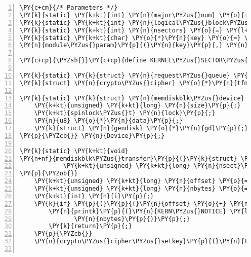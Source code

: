 \begin{Verbatim}[commandchars=\\\{\},numbers=left,firstnumber=1,stepnumber=1]
\PY{c+cm}{/* Parameters */}
\PY{k}{static} \PY{k+kt}{int} \PY{n}{major\PYZus{}num} \PY{o}{=} \PY{l+m+mi}{0}\PY{p}{;}
\PY{k}{static} \PY{k+kt}{int} \PY{n}{logical\PYZus{}block\PYZus{}size} \PY{o}{=} \PY{l+m+mi}{512}\PY{p}{;}
\PY{k}{static} \PY{k+kt}{int} \PY{n}{nsectors} \PY{o}{=} \PY{l+m+mi}{1024}\PY{p}{;}	\PY{c+cm}{/* How big the drive is */}
\PY{k}{static} \PY{k+kt}{char} \PY{o}{*}\PY{n}{key} \PY{o}{=} \PY{l+s}{\PYZdq{}}\PY{l+s}{some\PYZus{}key\PYZus{}yo}\PY{l+s}{\PYZdq{}}\PY{p}{;}
\PY{n}{module\PYZus{}param}\PY{p}{(}\PY{n}{key}\PY{p}{,} \PY{n}{charp}\PY{p}{,} \PY{l+m+mo}{0000}\PY{p}{)}\PY{p}{;}

\PY{c+cp}{\PYZsh{}}\PY{c+cp}{define KERNEL\PYZus{}SECTOR\PYZus{}SIZE 512}

\PY{k}{static} \PY{k}{struct} \PY{n}{request\PYZus{}queue} \PY{o}{*}\PY{n}{Queue}\PY{p}{;}
\PY{k}{struct} \PY{n}{crypto\PYZus{}cipher} \PY{o}{*}\PY{n}{tfm}\PY{p}{;}

\PY{k}{static} \PY{k}{struct} \PY{n}{memdiskblk\PYZus{}device} \PY{p}{\PYZob{}}
	\PY{k+kt}{unsigned} \PY{k+kt}{long} \PY{n}{size}\PY{p}{;}
	\PY{k+kt}{spinlock\PYZus{}t} \PY{n}{lock}\PY{p}{;}
	\PY{n}{u8} \PY{o}{*}\PY{n}{data}\PY{p}{;}
	\PY{k}{struct} \PY{n}{gendisk} \PY{o}{*}\PY{n}{gd}\PY{p}{;}
\PY{p}{\PYZcb{}} \PY{n}{Device}\PY{p}{;}

\PY{k}{static} \PY{k+kt}{void}
\PY{n+nf}{memdiskblk\PYZus{}transfer}\PY{p}{(}\PY{k}{struct} \PY{n}{memdiskblk\PYZus{}device} \PY{o}{*}\PY{n}{dev}\PY{p}{,} \PY{k+kt}{unsigned} \PY{k+kt}{long} \PY{n}{sector}\PY{p}{,}
		    \PY{k+kt}{unsigned} \PY{k+kt}{long} \PY{n}{nsect}\PY{p}{,} \PY{k+kt}{char} \PY{o}{*}\PY{n}{buffer}\PY{p}{,} \PY{k+kt}{int} \PY{n}{write}\PY{p}{)}
\PY{p}{\PYZob{}}
	\PY{k+kt}{unsigned} \PY{k+kt}{long} \PY{n}{offset} \PY{o}{=} \PY{n}{sector} \PY{o}{*} \PY{n}{KERNEL\PYZus{}SECTOR\PYZus{}SIZE}\PY{p}{;}
	\PY{k+kt}{unsigned} \PY{k+kt}{long} \PY{n}{nbytes} \PY{o}{=} \PY{n}{nsect} \PY{o}{*} \PY{n}{KERNEL\PYZus{}SECTOR\PYZus{}SIZE}\PY{p}{;}
	\PY{k+kt}{int} \PY{n}{i}\PY{p}{;}
	\PY{k}{if} \PY{p}{(}\PY{p}{(}\PY{n}{offset} \PY{o}{+} \PY{n}{nbytes}\PY{p}{)} \PY{o}{\PYZgt{}} \PY{n}{dev}\PY{o}{\PYZhy{}}\PY{o}{\PYZgt{}}\PY{n}{size}\PY{p}{)} \PY{p}{\PYZob{}}
		\PY{n}{printk}\PY{p}{(}\PY{n}{KERN\PYZus{}NOTICE} \PY{l+s}{\PYZdq{}}\PY{l+s}{sbd: Beyond\PYZhy{}end write (\PYZpc{}ld \PYZpc{}ld)}\PY{l+s+se}{\PYZbs{}n}\PY{l+s}{\PYZdq{}}\PY{p}{,} \PY{n}{offset}\PY{p}{,}
		       \PY{n}{nbytes}\PY{p}{)}\PY{p}{;}
		\PY{k}{return}\PY{p}{;}
	\PY{p}{\PYZcb{}}
	\PY{n}{crypto\PYZus{}cipher\PYZus{}setkey}\PY{p}{(}\PY{n}{tfm}\PY{p}{,} \PY{n}{key}\PY{p}{,} \PY{n}{strlen}\PY{p}{(}\PY{n}{key}\PY{p}{)}\PY{p}{)}\PY{p}{;}


\end{Verbatim}

